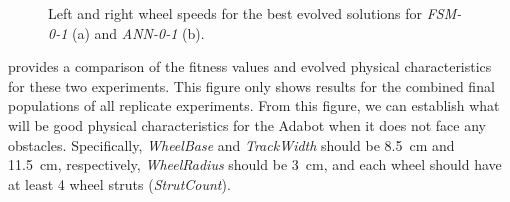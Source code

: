 \begin{figure}[!ht]
    \centering

    \hfil

    \caption{Left and right wheel speeds for the best evolved solutions for \emph{FSM-0-1} (a) and \emph{ANN-0-1} (b).}
    \label{fig:ANN-0-1-best-speed}

    \vspace{-0.1in}
\end{figure}


 provides a comparison of the fitness values and evolved physical characteristics for these two experiments.
%
This figure only shows results for the combined final populations of all replicate experiments.
%
From this figure, we can establish what will be good physical characteristics for the Adabot when it does not face any obstacles.
%
Specifically, \emph{WheelBase} and \emph{TrackWidth} should be 8.5~\si{cm} and 11.5~\si{cm}, respectively, \emph{WheelRadius} should be 3~\si{cm}, and each wheel should have at least 4 wheel struts (\emph{StrutCount}).


